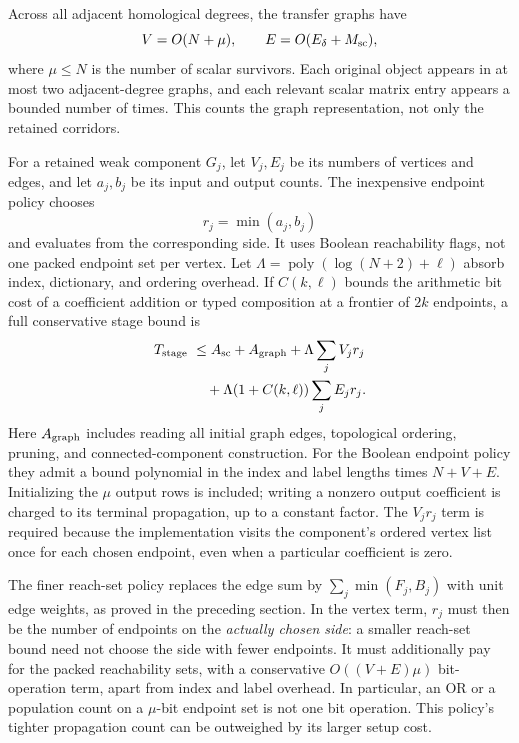 Across all adjacent homological degrees, the transfer graphs have
\[
 V=O(N+\mu),\qquad E=O(E_\delta+M_{\rm sc}),
\]
where $\mu\leq N$ is the number of scalar survivors. Each original
object appears in at most two adjacent-degree graphs, and each
relevant scalar matrix entry appears a bounded number of times. This
counts the graph representation, not only the retained corridors.

For a retained weak component $G_j$, let $V_j,E_j$ be its numbers of
vertices and edges, and let $a_j,b_j$ be its input and output counts.
The inexpensive endpoint policy chooses
\[
 r_j=\min(a_j,b_j)
\]
and evaluates from the corresponding side. It uses Boolean
reachability flags, not one packed endpoint set per vertex. Let
$\Lambda=\operatorname{poly}(\log(N+2)+\ell)$ absorb index,
dictionary, and ordering overhead. If $C(k,\ell)$ bounds the
arithmetic bit cost of a coefficient addition or typed composition
at a frontier of $2k$ endpoints, a full conservative stage bound is
\begin{equation}
 \begin{aligned}
 T_{\rm stage}\ &\leq A_{\rm sc}+A_{\rm graph}
   +\Lambda\sum_j V_jr_j\\
 &\quad+\Lambda(1+C(k,\ell))\sum_j E_jr_j.
 \end{aligned}
 \label{eq:full-stage}
\end{equation}
Here $A_{\rm graph}$ includes reading all initial graph edges,
topological ordering, pruning, and connected-component construction.
For the Boolean endpoint policy they admit a bound polynomial in
the index and label lengths times $N+V+E$. Initializing the $\mu$
output rows is included; writing a nonzero output coefficient is
charged to its terminal propagation, up to a constant factor. The
$V_jr_j$ term is required because the implementation visits the
component's ordered vertex list once for each chosen endpoint, even
when a particular coefficient is zero.

The finer reach-set policy replaces the edge sum by
$\sum_j\min(F_j,B_j)$ with unit edge weights, as proved in the
preceding section. In the vertex term, $r_j$ must then be the
number of endpoints on the \emph{actually chosen side}: a smaller
reach-set bound need not choose the side with fewer endpoints.
It must additionally pay for the packed reachability sets, with
a conservative $O((V+E)\mu)$ bit-operation term, apart from index
and label overhead. In particular, an OR or a population count on
a $\mu$-bit endpoint set is not one bit operation. This policy's
tighter propagation count can be outweighed by its larger setup cost.

